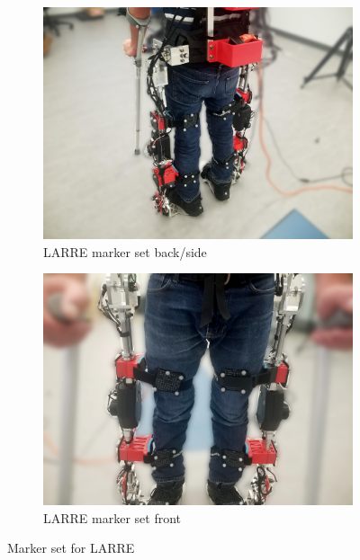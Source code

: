 \begin{figure}[h!]
    \begin{subfigure}{0.5\textwidth}
        \centering
        \captionsetup{justification=centering}
        \centerline{
        \includegraphics[scale=0.1, frame]{images/mech_design/exo_markers_back.png}}
        \caption[LARRE marker set back/side]{LARRE marker set back/side}
        \label{fig:larremarkerside}
    \end{subfigure}
    \begin{subfigure}{0.5\textwidth}
        \centering
        \captionsetup{justification=centering}
        \centerline{
        \includegraphics[scale=0.1, frame]{images/mech_design/exo_markers_front.png}}
        \caption[LARRE marker set front]{LARRE marker set front}
        \label{fig:larremarkerfront}
    \end{subfigure}    
    \caption{Marker set for LARRE}
    \label{fig:larremarker}
\end{figure}



